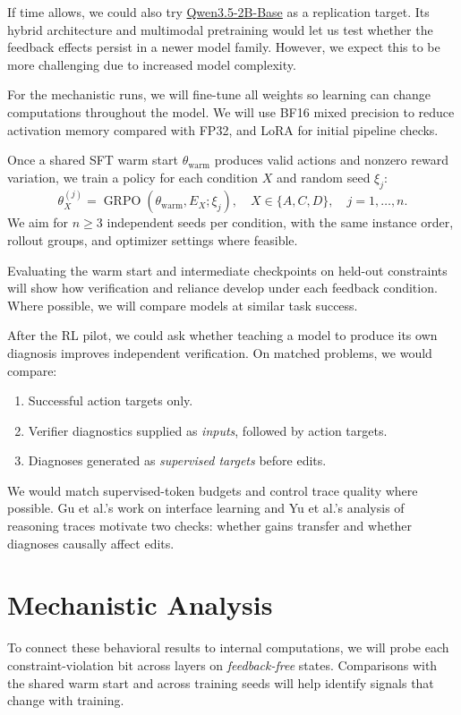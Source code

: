\documentclass[11pt]{article}
\begin{document}
If time allows, we could also try \href{https://huggingface.co/Qwen/Qwen3.5-2B-Base}{Qwen3.5-2B-Base} as a replication target. Its hybrid architecture and multimodal pretraining would let us test whether the feedback effects persist in a newer model family. However, we expect this to be more challenging due to increased model complexity.

For the mechanistic runs, we will fine-tune all weights so learning can change computations throughout the model. We will use BF16 mixed precision to reduce activation memory compared with FP32, and LoRA for initial pipeline checks.

Once a shared SFT warm start $\theta_{\mathrm{warm}}$ produces valid actions and nonzero reward variation, we train a policy for each condition $X$ and random seed $\xi_j$:
\begin{equation}
  \theta_X^{(j)}=\operatorname{GRPO}(\theta_{\mathrm{warm}},E_X;\xi_j),\quad X\in\{A,C,D\},\quad j=1,\ldots,n. \label{eq:training}
\end{equation}
We aim for $n\geq3$ independent seeds per condition, with the same instance order, rollout groups, and optimizer settings where feasible.

Evaluating the warm start and intermediate checkpoints on held-out constraints will show how verification and reliance develop under each feedback condition. Where possible, we will compare models at similar task success.

After the RL pilot, we could ask whether teaching a model to produce its own diagnosis improves independent verification. On matched problems, we would compare:
\begin{enumerate}\setlength{\itemsep}{0pt}\setlength{\parskip}{0pt}
  \item Successful action targets only.
  \item Verifier diagnostics supplied as \emph{inputs}, followed by action targets.
  \item Diagnoses generated as \emph{supervised targets} before edits.
\end{enumerate}
We would match supervised-token budgets and control trace quality where possible. Gu et al.'s work on interface learning \cite{gu2026trajectory} and Yu et al.'s analysis of reasoning traces \cite{yu2026outcome} motivate two checks: whether gains transfer and whether diagnoses causally affect edits.

\section{Mechanistic Analysis}
To connect these behavioral results to internal computations, we will probe each constraint-violation bit across layers on \emph{feedback-free} states. Comparisons with the shared warm start and across training seeds will help identify signals that change with training.
\end{document}
